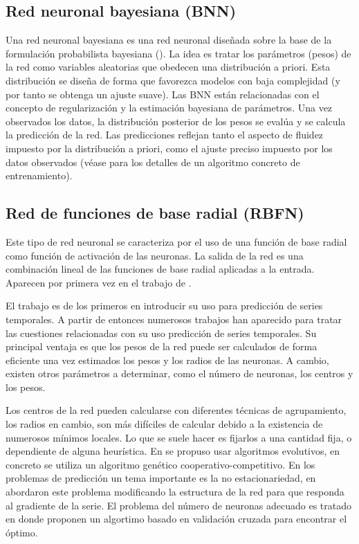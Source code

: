 \documentclass{llncs}
\begin{document}
\subsection{Red neuronal bayesiana (BNN)}
Una red neuronal bayesiana es una red neuronal diseñada sobre la base de la formulación probabilista bayesiana (\cite{mackay1992bayesian}). La idea es tratar los parámetros (pesos) de la red como variables aleatorias que obedecen una distribución a priori. Esta distribución se diseña de forma que favorezca modelos con baja complejidad (y por tanto se obtenga un ajuste suave). Las BNN están relacionadas con el concepto de regularización y la estimación bayesiana de parámetros. Una vez observados los datos, la distribución posterior de los pesos se evalúa y se calcula la predicción de la red. Las predicciones reflejan tanto el aspecto de fluidez impuesto por la distribución a priori, como el ajuste preciso impuesto por los datos observados (véase \cite{dan1997gauss} para los detalles de un algoritmo concreto de entrenamiento).

\subsection{Red de funciones de base radial (RBFN)}
Este tipo de red neuronal se caracteriza por el uso de una función de base radial como función de activación de las neuronas. La salida de la red es una combinación lineal de las funciones de base radial aplicadas a la entrada. Aparecen por primera vez en el trabajo de \cite{broomhead1988radial}. 

El trabajo \cite{chen1991orthogonal} es de los primeros en introducir su uso para predicción de series temporales. A partir de entonces numerosos trabajos han aparecido para tratar las cuestiones relacionadas con su uso predicción de series temporales. Su principal ventaja es que los pesos de la red puede ser calculados de forma eficiente una vez estimados los pesos y los radios de las neuronas. A cambio, existen otros parámetros a determinar, como el número de neuronas, los centros y los pesos.

Los centros de la red pueden calcularse con diferentes técnicas de agrupamiento, los radios en cambio, son más difíciles de calcular debido a la existencia de numerosos mínimos locales. Lo que se suele hacer es fijarlos a una cantidad fija, o dependiente de alguna heurística. En \cite{whitehead1996cooperative} se propuso usar algoritmos evolutivos, en concreto se utiliza un algoritmo genético cooperativo-competitivo. En los problemas de predicción un tema importante es la no estacionariedad, en \cite{chng1996gradient} abordaron este problema modificando la estructura de la red para que responda al gradiente de la serie. El problema del número de neuronas adecuado es tratado en \cite{leung2001prediction} donde proponen un algortimo basado en validación cruzada para encontrar el óptimo.
\end{document}
